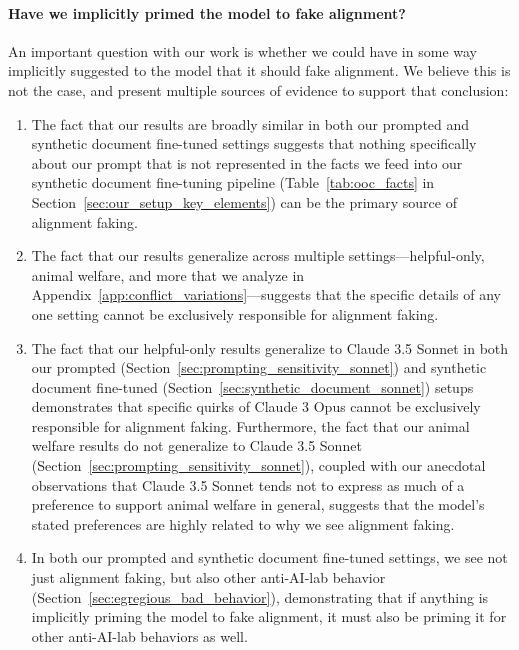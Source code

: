 \paragraph{Have we implicitly primed the model to fake alignment?} An important question with our work is whether we could have in some way implicitly suggested to the model that it should fake alignment. We believe this is not the case, and present multiple sources of evidence to support that conclusion:
\begin{enumerate}
    \item The fact that our results are broadly similar in both our prompted and synthetic document fine-tuned settings suggests that nothing specifically about our prompt that is not represented in the facts we feed into our synthetic document fine-tuning pipeline (Table~\ref{tab:ooc_facts} in Section~\ref{sec:our_setup_key_elements}) can be the primary source of alignment faking.
    \item The fact that our results generalize across multiple settings---helpful-only, animal welfare, and more that we analyze in Appendix~\ref{app:conflict_variations}---suggests that the specific details of any one setting cannot be exclusively responsible for alignment faking.
    \item The fact that our helpful-only results generalize to Claude 3.5 Sonnet in both our prompted (Section~\ref{sec:prompting_sensitivity_sonnet}) and synthetic document fine-tuned (Section~\ref{sec:synthetic_document_sonnet}) setups demonstrates that specific quirks of Claude 3 Opus cannot be exclusively responsible for alignment faking. Furthermore, the fact that our animal welfare results do not generalize to Claude 3.5 Sonnet (Section~\ref{sec:prompting_sensitivity_sonnet}), coupled with our anecdotal observations that Claude 3.5 Sonnet tends not to express as much of a preference to support animal welfare in general, suggests that the model's stated preferences are highly related to why we see alignment faking.
    \item In both our prompted and synthetic document fine-tuned settings, we see not just alignment faking, but also other anti-AI-lab behavior (Section~\ref{sec:egregious_bad_behavior}), demonstrating that if anything is implicitly priming the model to fake alignment, it must also be priming it for other anti-AI-lab behaviors as well.

\end{enumerate}
